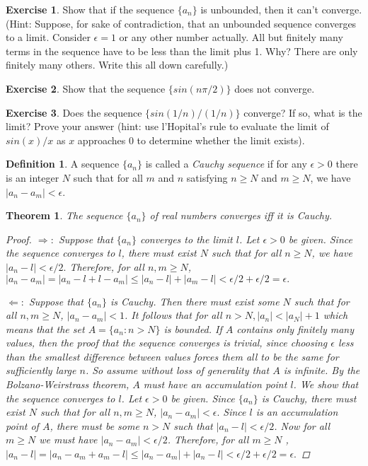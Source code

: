 \documentclass[11pt,a4paper]{report}
\theoremstyle{plain}
\newtheorem{thm}{Theorem}[section]
\theoremstyle{definition}
\newtheorem{defn}{Definition}[section]
\newtheorem{exercise}{Exercise}[section]
\theoremstyle{remark}
\begin{document}
\begin{exercise} Show that if the sequence $\{a_n\}$ is unbounded, then it can't converge. (Hint: Suppose, for sake of contradiction, that an unbounded sequence converges to a limit. Consider $\epsilon = 1$ or any other number actually. All but finitely many terms in the sequence have to be less than the limit plus 1. Why?  There are only finitely many others.  Write this all down carefully.)
\end{exercise}
\begin{exercise} Show that the sequence $\{sin(n \pi / 2)\}$ does not converge.
\end{exercise}
\begin{exercise}
Does the sequence $\{sin(1/n) / (1/n)\}$ converge?  If so, what is the limit? Prove your answer (hint: use l'Hopital's rule to evaluate the limit of $sin(x) / x$ as $x$ approaches $0$ to determine whether the limit exists).
\end{exercise}
\begin{defn}
A sequence $\{a_n\}$ is called a \textit{Cauchy sequence} if for any $\epsilon > 0$ there is an integer $N$ such that for all $m$ and $n$ satisfying $n \geq N$ and $m \geq N$, we have $|a_n - a_m|< \epsilon$.
\end{defn}
\begin{thm}
The sequence $\{a_n\}$ of real numbers converges iff it is Cauchy.
\begin{proof}
$\Rightarrow:$ Suppose that $\{a_n\}$ converges to the limit $l$.  Let $\epsilon>0$ be given. Since the sequence converges to $l$, there must exist $N$ such that for all $n \geq N$, we have $|a_n - l| < \epsilon / 2.$  Therefore, for all $n,m \geq N$,
$|a_n - a_m| = |a_n - l + l - a_m| \leq |a_n - l| + |a_m - l| <\epsilon / 2 + \epsilon /2 = \epsilon.$

$\Leftarrow:$ Suppose that $\{a_n\}$ is Cauchy. Then there must exist some $N$ such that for all $n,m \geq N$,
$|a_n - a_m| < 1$. It follows that for all $n > N, |a_n| < |a_N| + 1$ which means that the set $A = \{a_n : n > N\}$ is bounded.  If $A$ contains only finitely many values, then the proof that the sequence converges is trivial, since choosing $\epsilon$ less than the smallest difference between values forces them all to be the same for sufficiently large $n$.  So assume without loss of generality that $A$ is infinite. By the Bolzano-Weirstrass theorem, $A$ must have an accumulation point $l$.  We show that the sequence converges to $l$.  Let $\epsilon>0$ be given.  Since $\{a_n\}$ is Cauchy, there must exist $N$ such that for all $n,m \geq N$, $|a_n - a_m| < \epsilon.$  Since $l$ is an accumulation point of $A$, there must be some $n > N$ such that $|a_n - l| < \epsilon/2$.  Now for all $m \geq N$ we must have $|a_n - a_m| < \epsilon/2$.  Therefore, for all $m \geq N$ , $|a_n - l| = |a_n -a_m + a_m - l| \leq |a_n - a_m| + |a_n - l| < \epsilon/2 + \epsilon/2 = \epsilon.$ 
\end{proof}
\end{thm}
\end{document}
